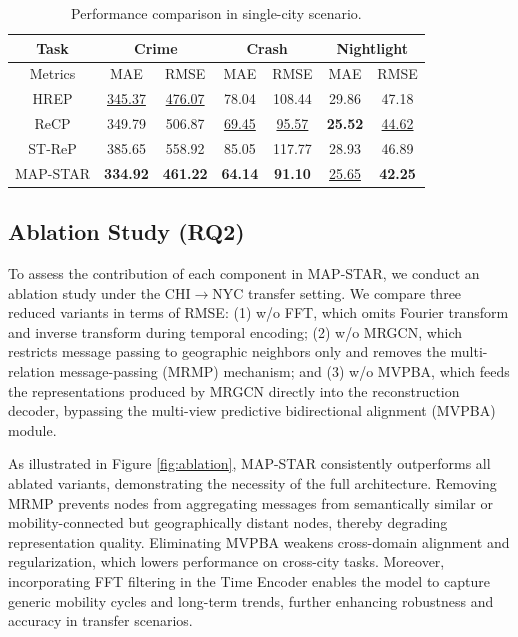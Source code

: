 \begin{table}[htbp]
\centering
\setlength{\tabcolsep}{2.75pt}
\renewcommand\arraystretch{1.31}
\begin{tabular}{c|cc|cc|cc}
\toprule
Task & \multicolumn{2}{c|}{\textbf{Crime}} & \multicolumn{2}{c|}{\textbf{Crash}} & \multicolumn{2}{c}{\textbf{Nightlight}} \\
\midrule
Metrics & MAE & RMSE & MAE & RMSE & MAE & RMSE \\
\midrule
HREP & \underline{345.37} & \underline{476.07} & 78.04 & 108.44 & 29.86 & 47.18 \\
ReCP  & 349.79 & 506.87 & \underline{69.45} & \underline{95.57} & \textbf{25.52} & \underline{44.62} \\
ST-ReP  & 385.65 & 558.92 & 85.05 & 117.77 & 28.93 & 46.89 \\
MAP-STAR  & \textbf{334.92} & \textbf{461.22} & \textbf{64.14} & \textbf{91.10} & \underline{25.65} & \textbf{42.25} \\
\bottomrule
\end{tabular}
\caption{Performance comparison in single-city scenario.}
\label{tab:single_city}
\end{table}

\subsection{Ablation Study (RQ2)}

To assess the contribution of each component in MAP-STAR, we conduct an ablation study under the CHI$\rightarrow$NYC transfer setting. We compare three reduced variants in terms of RMSE: (1) w/o FFT, which omits Fourier transform and inverse transform during temporal encoding; (2) w/o MRGCN, which restricts message passing to geographic neighbors only and removes the multi-relation message-passing (MRMP) mechanism; and (3) w/o MVPBA, which feeds the representations produced by MRGCN directly into the reconstruction decoder, bypassing the multi-view predictive bidirectional alignment (MVPBA) module.

As illustrated in Figure \ref{fig:ablation}, MAP-STAR consistently outperforms all ablated variants, demonstrating the necessity of the full architecture. Removing MRMP prevents nodes from aggregating messages from semantically similar or mobility-connected but geographically distant nodes, thereby degrading representation quality. Eliminating MVPBA weakens cross-domain alignment and regularization, which lowers performance on cross-city tasks. Moreover, incorporating FFT filtering in the Time Encoder enables the model to capture generic mobility cycles and long-term trends, further enhancing robustness and accuracy in transfer scenarios.


